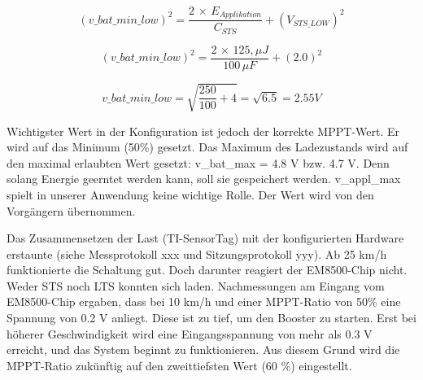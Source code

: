 \begin{equation}
(v\_bat\_min\_low) ^2  =  \frac{2\, \times \, E_{Applikation}}{C_{STS}} + (V_{STS\_LOW})^2
\end{equation}

\begin{equation}
(v\_bat\_min\_low) ^2  =  \frac{2\, \times \, 125, \mu J}{100 \,\mu F} + (2.0)^2
\end{equation}

\begin{equation}
v\_bat\_min\_low  =  \sqrt{\frac{250}{100 } + 4} = \sqrt{6.5} = 2.55 V
\end{equation}

Wichtigster Wert in der Konfiguration ist jedoch der korrekte MPPT-Wert. Er wird auf das Minimum (50\thinspace\%) gesetzt. Das Maximum des Ladezustands  wird auf den maximal erlaubten Wert gesetzt: v\_bat\_max  = 4.8 V bzw. 4.7 V. Denn solang Energie geerntet werden kann, soll sie gespeichert werden. v\_appl\_max spielt in unserer Anwendung keine wichtige Rolle. Der Wert wird von den Vorgängern übernommen.

Das Zusammensetzen der Last (TI-SensorTag) mit der konfigurierten Hardware erstaunte (siehe Messprotokoll xxx und Sitzungsprotokoll yyy). Ab 25 km/h funktionierte die Schaltung gut. Doch darunter reagiert der EM8500-Chip nicht. Weder STS noch LTS konnten sich laden. Nachmessungen am Eingang vom EM8500-Chip ergaben, dass bei  10 km/h und einer MPPT-Ratio von 50\thinspace\% eine Spannung von 0.2 V anliegt. Diese ist zu tief, um den Booster zu starten. Erst bei höherer Geschwindigkeit wird eine Eingangsspannung von mehr als 0.3 V erreicht, und das System beginnt zu funktionieren. Aus diesem Grund wird die MPPT-Ratio zukünftig auf den zweittiefsten Wert (60 \thinspace\%) eingestellt.


